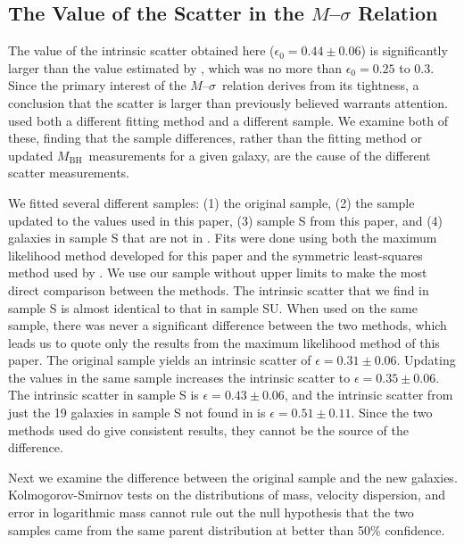 \documentclass[twosided,letterpaper,numberedappendix]{emulateapj}
\newcommand{\msigma}   {\ensuremath{M}{--}\ensuremath{\sigma}}
\newcommand{\mbh}      {\ensuremath{M_{\mathrm{BH}}}}
\newcommand{\msscaterr} {\ensuremath{0.44 \pm 0.06}}
\begin{document}
\subsection{The Value of the Scatter in the \texorpdfstring{\msigma}{M-sigma} 
Relation}
\label{sizeofscatter}
The value of the intrinsic scatter obtained here ($\epsilon_0 =
\msscaterr$) is significantly larger than the value estimated by
\citet{tremaineetal02}, which was no more than $\epsilon_0 = 0.25$ to
$0.3$.  Since the primary interest of the \msigma\ relation derives
from its tightness, a conclusion that the scatter is larger than
previously believed warrants attention.  \citet{tremaineetal02} used
both a different fitting method and a different sample.  We examine
both of these, finding that the sample differences, rather than the
fitting method or updated \mbh\ measurements for a given galaxy, are
the cause of the different scatter measurements.

We fitted several different samples: (1) the original \citet{tremaineetal02}
sample, (2) the \citet{tremaineetal02} sample updated to the values
used in this paper, (3) sample S from this paper, and (4) galaxies in
sample S that are not in \citet{tremaineetal02}.  Fits were done using
both the maximum likelihood method developed for this paper and the
symmetric least-squares method used by \citet{tremaineetal02}.
We use our sample
without upper limits to make the most direct comparison between the
methods.  The intrinsic scatter that we find in sample S is almost
identical to that in sample SU.  When used on the same sample, there
was never a significant difference between the two methods, which
leads us to quote only the results from the maximum likelihood method
of this paper.  The original \citet{tremaineetal02} sample yields an
intrinsic scatter of $\epsilon = 0.31 \pm 0.06$.  Updating the values
in the same sample increases the intrinsic scatter to $\epsilon = 0.35
\pm 0.06$.  The intrinsic scatter in sample S is $\epsilon = 0.43 \pm
0.06$, and the intrinsic scatter from just the 19 galaxies in sample S
not found in \citet{tremaineetal02} is $\epsilon = 0.51 \pm 0.11$.
Since the two methods used do give consistent results, they cannot
be the source of the difference.  

Next we examine the difference between the original
\citet{tremaineetal02} sample and the new galaxies.
Kolmogorov-Smirnov tests on the distributions of mass, velocity
dispersion, and error in logarithmic mass cannot rule out the null
hypothesis that the two samples came from the same parent distribution
at better than 50\% confidence.
\end{document}
